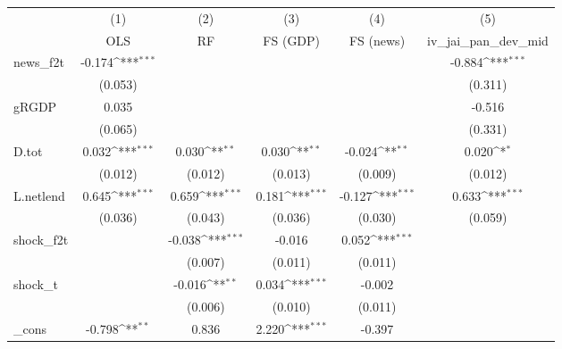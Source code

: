 {
\def\sym#1{\ifmmode^{#1}\else\(^{#1}\)\fi}
\begin{tabular}{l*{5}{c}}
\toprule
            &\multicolumn{1}{c}{(1)}&\multicolumn{1}{c}{(2)}&\multicolumn{1}{c}{(3)}&\multicolumn{1}{c}{(4)}&\multicolumn{1}{c}{(5)}\\
            &\multicolumn{1}{c}{OLS}&\multicolumn{1}{c}{RF}&\multicolumn{1}{c}{FS (GDP)}&\multicolumn{1}{c}{FS (news)}&\multicolumn{1}{c}{iv\_jai\_pan\_dev\_mid}\\
\midrule
news\_f2t    &      -0.174\sym{***}&                     &                     &                     &      -0.884\sym{***}\\
            &     (0.053)         &                     &                     &                     &     (0.311)         \\
\addlinespace
gRGDP       &       0.035         &                     &                     &                     &      -0.516         \\
            &     (0.065)         &                     &                     &                     &     (0.331)         \\
\addlinespace
D.tot       &       0.032\sym{***}&       0.030\sym{**} &       0.030\sym{**} &      -0.024\sym{**} &       0.020\sym{*}  \\
            &     (0.012)         &     (0.012)         &     (0.013)         &     (0.009)         &     (0.012)         \\
\addlinespace
L.netlend   &       0.645\sym{***}&       0.659\sym{***}&       0.181\sym{***}&      -0.127\sym{***}&       0.633\sym{***}\\
            &     (0.036)         &     (0.043)         &     (0.036)         &     (0.030)         &     (0.059)         \\
\addlinespace
shock\_f2t   &                     &      -0.038\sym{***}&      -0.016         &       0.052\sym{***}&                     \\
            &                     &     (0.007)         &     (0.011)         &     (0.011)         &                     \\
\addlinespace
shock\_t     &                     &      -0.016\sym{**} &       0.034\sym{***}&      -0.002         &                     \\
            &                     &     (0.006)         &     (0.010)         &     (0.011)         &                     \\
\addlinespace
\_cons      &      -0.798\sym{**} &       0.836         &       2.220\sym{***}&      -0.397         &                     \\

\end{tabular}}
